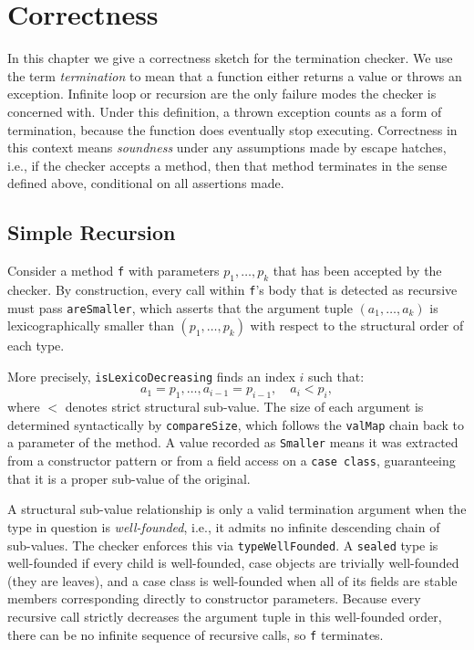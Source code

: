 \chapter{Correctness}

In this chapter we give a correctness sketch for the termination checker. We use
the term \emph{termination} to mean that a function either returns a value or
throws an exception. Infinite loop or recursion are the only failure modes the
checker is concerned with.
Under this definition, a thrown exception counts as a form of termination,
because the function does eventually stop executing.
Correctness in this context means \emph{soundness} under any assumptions made by
escape hatches, i.e., if the checker accepts a method, then that method
terminates in the sense defined above, conditional on all assertions made.

\section{Simple Recursion}
Consider a method \texttt{f} with parameters $p_1, \ldots, p_k$ that has been
accepted by the checker. By construction, every call within \texttt{f}'s body
that is detected as recursive must pass \texttt{areSmaller}, which asserts that
the argument tuple $(a_1, \ldots, a_k)$ is lexicographically smaller
than $(p_1, \ldots, p_k)$ with respect to the structural order of each type.

More precisely, \texttt{isLexicoDecreasing} finds an index $i$ such that:
$$ a_1 = p_1, \ldots, a_{i-1} = p_{i-1},\quad a_i < p_i, $$
where $<$ denotes strict structural sub-value. The size of each argument is
determined syntactically by \texttt{compareSize}, which follows the
\texttt{valMap} chain back to a parameter of the method. A value recorded as
\texttt{Smaller} means it was extracted from a constructor pattern or from a
field access on a \texttt{case class}, guaranteeing that it is a proper
sub-value of the original.

A structural sub-value relationship is only a valid termination argument when
the type in question is \emph{well-founded}, i.e., it admits no infinite
descending chain of sub-values. The checker enforces this via
\texttt{typeWellFounded}. A \texttt{sealed} type is well-founded if every child
is well-founded, case objects are trivially well-founded (they are leaves), and
a case class is well-founded when all of its fields are stable members
corresponding directly to constructor parameters. Because every recursive call
strictly decreases the argument tuple in this well-founded order, there can be
no infinite sequence of recursive calls, so \texttt{f} terminates.


